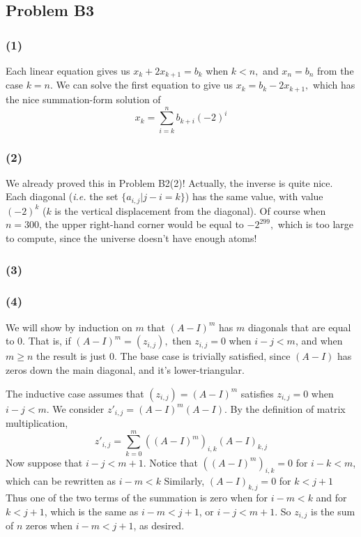 \documentclass{article}
\begin{document}
\subsection{Problem B3}
\subsubsection{(1)}
Each linear equation gives us $x_k + 2x_{k+1} = b_k$ when $k < n,$ and
$x_n = b_n$ from the case $k = n.$ We can solve the first equation to give us
$x_k = b_k - 2x_{k+1},$ which has the nice summation-form solution of
\[x_k  = \sum_{i=k}^nb_{k+i}(-2)^i\]

\subsubsection{(2)}
We already proved this in Problem B2(2)!
Actually, the inverse is quite nice. Each diagonal (\emph{i.e.} the set
$\{a_{i,j}|j-i=k\}$) has the same value, with value $(-2)^k$ ($k$ is the vertical
displacement from the diagonal).
Of course when $n=300$, the upper right-hand corner would be equal to
$-2^{299},$ which is too large to compute, since the universe doesn't have
enough atoms!

\subsubsection{(3)}
\subsubsection{(4)}
We will show by induction on $m$ that $(A-I)^m$ has $m$ diagonals that are equal
to 0. That is, if $(A-I)^m = (z_{i,j}),$ then $z_{i,j} = 0$ when $i - j < m$,
and when $m \geq n$ the result is just 0.
The base case is trivially satisfied, since $(A-I)$ has zeros down the main
diagonal, and it's lower-triangular.

The inductive case assumes that $(z_{i,j}) = (A-I)^m$ satisfies 
$z_{i,j} = 0$ when $i - j < m$.
We consider $z'_{i,j} = (A-I)^m(A-I).$
By the definition of matrix multiplication, 
\[z'_{i,j} = \sum_{k=0}^m ((A-I)^m)_{i,k}(A-I)_{k,j}\]
Now suppose that $i - j < m + 1.$
Notice that $((A - I)^m)_{i,k} = 0$ for $i - k < m$, which can be rewritten as
$i - m < k$
Similarly, $(A - I)_{k,j} = 0$ for $k < j + 1$
Thus one of the two terms of the summation is zero when for $i - m < k$ and
for $k < j + 1$, which is the same as $i - m < j + 1$, or $i - j < m + 1$.
So $z_{i,j}$ is the sum of $n$ zeros when $i - m < j + 1$, as desired.
\end{document}
